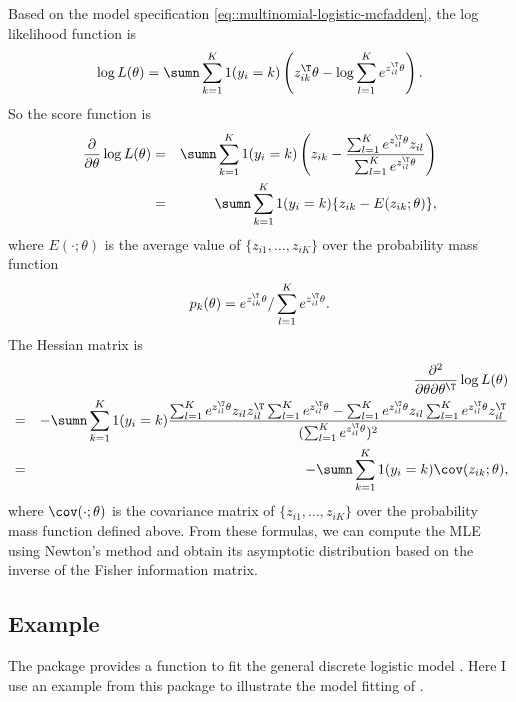 Based on the model specification \eqref{eq::multinomial-logistic-mcfadden}, the log likelihood function is
$$
\log L(\theta) 
= \sumn \sum_{k=1}^K 1(y_i = k)  \left(  z_{ik}^{\T}\theta -   \log \sum_{ l =1}^{K}e^{ z_{i l }^{\T}\theta }   \right).
$$
So the score function is
\begin{eqnarray*}
\frac{\partial }{ \partial \theta } \log L(\theta) 
&=& \sumn \sum_{k=1}^K 1(y_i = k)    \left(  z_{ik}  -   
\frac{   \sum_{ l =1}^{K}e^{ z_{i l }^{\T}\theta }  z_{i l } }{\sum_{ l =1}^{K}e^{ z_{i l }^{\T}\theta }  } \right) \\
&=& \sumn \sum_{k=1}^K 1(y_i = k)    \{  z_{ik}  -  E(z_{ik};\theta)    \},
\end{eqnarray*}
where $E(\cdot; \theta) $ is the average value of $\{ z_{i1}, \ldots, z_{iK} \}$ over the probability mass function
$$
p_k(\theta) = e^{z_{ik}^{\T}\theta} / \sum_{ l =1}^{K}e^{ z_{i l }^{\T}\theta }.
$$
The Hessian matrix is
\begin{eqnarray*}
&&\frac{\partial^2 }{ \partial \theta\partial \theta^{\T}  } \log L(\theta)  \\
&=& - \sumn \sum_{k=1}^K 1(y_i = k)  
\frac{   \sum_{ l =1}^{K}e^{ z_{i l }^{\T}\theta }  z_{i l } z_{i l }^{\T}\sum_{ l =1}^{K}e^{ z_{i l }^{\T}\theta }
- \sum_{ l =1}^{K}e^{ z_{i l }^{\T}\theta }  z_{i l } \sum_{ l =1}^{K}e^{ z_{i l }^{\T}\theta }  z_{i l }^{\T}
 }{  (\sum_{ l =1}^{K}e^{ z_{i l }^{\T}\theta })^2  }  \\
 &=& - \sumn \sum_{k=1}^K 1(y_i = k)   \cov(z_{ik}; \theta),
\end{eqnarray*}
where $\cov(\cdot; \theta) $ is the covariance matrix of $\{ z_{i1}, \ldots, z_{iK} \}$ over the probability mass function defined above. 
From these formulas, we can compute the MLE using Newton's method and obtain its asymptotic distribution based on the inverse of the Fisher information matrix. 

\subsection{Example}

The  package  provides a function  to fit the general discrete logistic model \citep{croissant2020estimation}. 
Here I use an example from this package to illustrate the model fitting of . 


